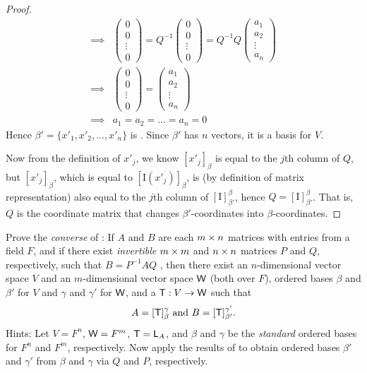 \begin{proof}
\begin{align*}
    \implies & \begin{pmatrix} 0 \\ 0 \\ \vdots \\ 0 \end{pmatrix} = Q^{-1} \begin{pmatrix} 0 \\ 0 \\ \vdots \\ 0 \end{pmatrix}
    = Q^{-1} Q \begin{pmatrix} a_1 \\ a_2 \\ \vdots \\ a_n \end{pmatrix} \\
    \implies & \begin{pmatrix} 0 \\ 0 \\ \vdots \\ 0 \end{pmatrix}
    = \begin{pmatrix} a_1 \\ a_2 \\ \vdots \\ a_n \end{pmatrix} \\
    \implies & a_1 = a_2 = ... = a_n = 0
\end{align*}
Hence \(\beta' = \{ x'_1, x'_2, ..., x'_n \}\) is \LID{}.
Since \(\beta'\) has \(n\) vectors, it is a basis for \(V\).

Now from the definition of \(x'_j\), we know \([x'_j]_{\beta}\) is equal to the \(j\)th column of \(Q\), but \([x'_j]_{\beta}\), which is equal to \([\mathrm{I}(x'_j)]_{\beta}\),
is (by definition of matrix representation) also equal to the \(j\)th column of \([\mathrm{I}]_{\beta'}^{\beta}\), hence \(Q = [\mathrm{I}]_{\beta'}^{\beta}\).
That is, \(Q\) is the coordinate matrix that changes \(\beta'\)-coordinates into \(\beta\)-coordinates.
\end{proof}

\begin{exercise} \label{exercise 2.5.14}
Prove the \emph{converse} of :
If \(A\) and \(B\) are each \(m \times n\) matrices with entries from a field \(F\), and if there exist \emph{invertible} \(m \times m\) and \(n \times n\) matrices \(P\) and \(Q\), respectively,
such that \(B = P^{-1} A Q\) , then there exist an \(n\)-dimensional vector space \(V\) and an \(m\)-dimensional vector space \(\textsf{W}\) (both over \(F\)), ordered bases \(\beta\) and \(\beta'\) for \(V\) and \(\gamma\) and \(\gamma'\) for \(\textsf{W}\),
and a \LTRAN{} \(\textsf{T} : V \to \textsf{W}\) such that
\[
    A = [\textsf{T}]_{\beta}^{\gamma} \text{ and } B = [\textsf{T}]_{\beta'}^{\gamma'}.
\]
Hints: Let \(V = F^n\), \(\textsf{W} = F^m\), \(\textsf{T} = \textsf{L}_A\), and \(\beta\) and \(\gamma\) be the \emph{standard} ordered bases for \(F^n\) and \(F^m\), respectively.
Now apply the results of  to obtain ordered bases \(\beta'\) and \(\gamma'\) from \(\beta\) and \(\gamma\) via \(Q\) and \(P\), respectively.
\end{exercise}

